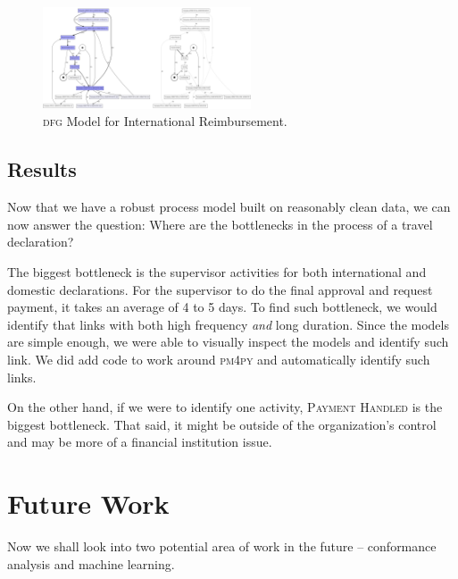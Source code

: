\documentclass[conference]{IEEEtran}
\begin{document}
\begin{figure}[htbp]
\centerline{\includegraphics[width=0.55\textwidth]{images/international.png}}
\caption{\textsc{dfg} Model for International Reimbursement.}
\label{fig-international}
\end{figure}


\subsection{Results}

Now that we have a robust process model built on reasonably clean data,
we can now answer the question: 
Where are the bottlenecks in the process of a travel declaration?

The biggest bottleneck is the supervisor activities for both international
and domestic declarations.  For the supervisor to do the final approval and
request payment, it takes an average of 4 to 5 days.
To find such bottleneck, we would identify that
links with both high frequency \textit{and} long duration. Since the models
are simple enough, we were able to visually inspect the models and identify
such link. We did add code to work around \textsc{pm4py} and
automatically identify such links.

On the other hand, if we
were to identify one activity, \textsc{Payment Handled}
is the biggest bottleneck. That said,
it might be outside of the organization’s control and may be more of a
financial institution issue.


\section{Future Work}
\label{section-future}

Now we shall look into two potential area of work in the future --
conformance analysis and machine learning.
\end{document}
